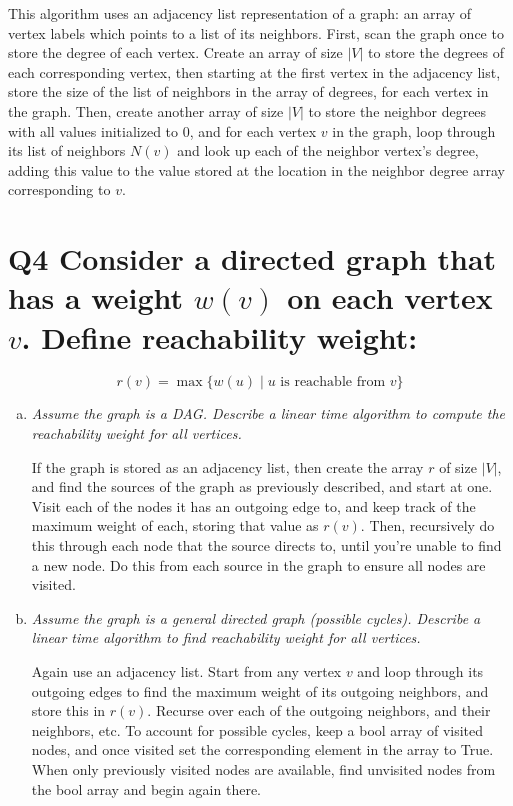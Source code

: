 \documentclass{article}
\begin{document}
This algorithm uses an adjacency list representation of a graph: an array of vertex labels which points to a list of its neighbors. First, scan the graph once to store the degree of each vertex. Create an array of size $|V|$ to store the degrees of each corresponding vertex, then starting at the first vertex in the adjacency list, store the size of the list of neighbors in the array of degrees, for each vertex in the graph. Then, create another array of size $|V|$ to store the neighbor degrees with all values initialized to 0, and for each vertex $v$ in the graph, loop through its list of neighbors $N(v)$ and look up each of the neighbor vertex's degree, adding this value to the value stored at the location in the neighbor degree array corresponding to $v$.




\section*{Q4 \normalsize Consider a directed graph that has a weight $w(v)$ on each vertex $v$. Define reachability weight:}

\[
  r(v) = \max\{w(u) \mid u \text{ is reachable from } v \}
\]

\begin{enumerate}[(a)]
  \item \textit{Assume the graph is a DAG. Describe a linear time algorithm to compute the reachability weight for all vertices.}

    If the graph is stored as an adjacency list, then create the array $r$ of size $|V|$, and find the sources of the graph as previously described, and start at one. Visit each of the nodes it has an outgoing edge to, and keep track of the maximum weight of each, storing that value as $r(v)$. Then, recursively do this through each node that the source directs to, until you're unable to find a new node. Do this from each source in the graph to ensure all nodes are visited.
  \item \textit{Assume the graph is a general directed graph (possible cycles). Describe a linear time algorithm to find reachability weight for all vertices.}

    Again use an adjacency list. Start from any vertex $v$ and loop through its outgoing edges to find the maximum weight of its outgoing neighbors, and store this in $r(v)$. Recurse over each of the outgoing neighbors, and their neighbors, etc. To account for possible cycles, keep a bool array of visited nodes, and once visited set the corresponding element in the array to True. When only previously visited nodes are available, find unvisited nodes from the bool array and begin again there.
\end{enumerate}
\end{document}
